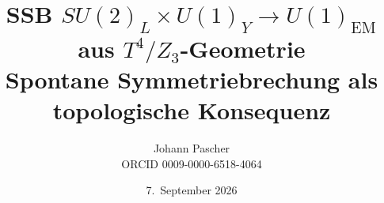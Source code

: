 \documentclass[11pt,a4paper]{report}
\title{SSB $SU(2)_L\times U(1)_Y\to U(1)_\text{EM}$ aus $T^4/Z_3$-Geometrie\\[0.5em]
  \large Spontane Symmetriebrechung als topologische Konsequenz}
\date{7.~September 2026}
\author{Johann Pascher\\\small ORCID 0009-0000-6518-4064}
\begin{document}
\renewcommand{\thechapter}{}
\renewcommand{\thesection}{\arabic{section}}
\maketitle
\tableofcontents

\end{document}
